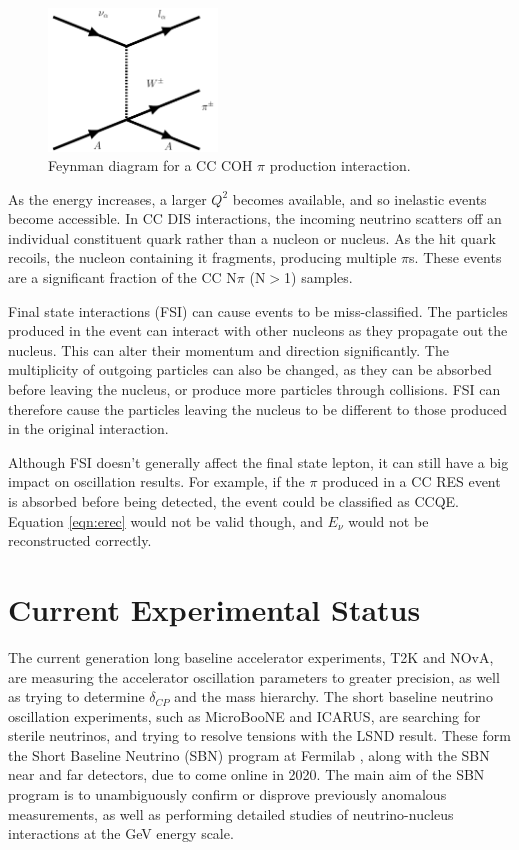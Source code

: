 \begin{figure}[!htbp]
\vspace{20pt}
\centering
\includegraphics*[width=0.4\textwidth,clip]{figs/feynmanCOH}
\caption{Feynman diagram for a CC COH $\pi$ production interaction. 
} \label{COHdiagram}
\end{figure}

As the energy increases, a larger $Q^2$ becomes available, and so inelastic events become accessible. In CC DIS interactions, the incoming neutrino scatters off an individual constituent quark rather than a nucleon or nucleus. As the hit quark recoils, the nucleon containing it fragments, producing multiple $\pi$s. These events are a significant fraction of the CC N$\pi$ (N$>$1) samples.

Final state interactions (FSI) can cause events to be miss-classified. The particles produced in the event can interact with other nucleons as they propagate out the nucleus. This can alter their momentum and direction significantly. The multiplicity of outgoing particles can also be changed, as they can be absorbed before leaving the nucleus, or produce more particles through collisions. FSI can therefore cause the particles leaving the nucleus to be different to those produced in the original interaction.

Although FSI doesn't generally affect the final state lepton, it can still have a big impact on oscillation results. For example, if the $\pi$ produced in a CC RES event is absorbed before being detected, the event could be classified as CCQE. Equation \eqref{eqn:erec} would not be valid though, and $E_\nu$ would not be reconstructed correctly. 

\section{Current Experimental Status}\label{sec:status}

The current generation long baseline accelerator experiments, T2K and NOvA, are measuring the accelerator oscillation parameters to greater precision, as well as trying to determine $\delta_{CP}$ and the mass hierarchy. The short baseline neutrino oscillation experiments, such as MicroBooNE \cite{microboone} and ICARUS, are searching for sterile neutrinos, and trying to resolve tensions with the LSND result. These form the Short Baseline Neutrino (SBN) program at Fermilab \cite{sbn}, along with the SBN near and far detectors, due to come online in 2020. The main aim of the SBN program is to unambiguously confirm or disprove previously anomalous measurements, as well as performing detailed studies of neutrino-nucleus interactions at the GeV energy scale.

